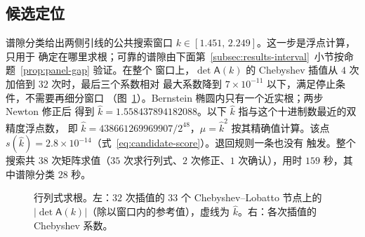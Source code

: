 \subsection{候选定位}
\label{subsec:results-search}

谱隙分类给出两侧引线的公共搜索窗口 $k\in[1.451,\,2.249]$。这一步是浮点计算，只用于
确定在哪里求根；可靠的谱隙由下面第~\ref{subsec:results-interval}~小节按命题~\ref{prop:panel-gap} 验证。在整个
窗口上，$\det\mathsf A(k)$ 的 Chebyshev 插值从 $4$ 次加倍到 $32$ 次时，最后三个系数相对
最大系数降到 $7\times10^{-11}$ 以下，满足停止条件，不需要再细分窗口
（图~\ref{fig:results-determinant}）。Bernstein 椭圆内只有一个近实根；两步 Newton 修正后
得到 $\widehat k=1.558437894182088$。以下 $\widehat k$ 指与这个十进制数最近的双精度浮点数，
即 $\widehat k=438661269969907/2^{48}$，$\mu=\widehat k^2$ 按其精确值计算。该点 $s(\widehat k)=2.8\times10^{-14}$（式~\eqref{eq:candidate-score}）。退回规则一条也没有
触发。整个搜索共 $38$ 次矩阵求值（$35$ 次求行列式、$2$ 次修正、$1$ 次确认），用时
$159$ 秒，其中谱隙分类 $28$ 秒。

\begin{figure}[htbp]
  \centering
  \caption{行列式求根。左：$32$ 次插值的 $33$ 个 Chebyshev--Lobatto 节点上的
  $|\det\mathsf A(k)|$（除以窗口内的参考值），虚线为 $\widehat k$。右：各次插值的
  Chebyshev 系数。}
  \label{fig:results-determinant}
\end{figure}

